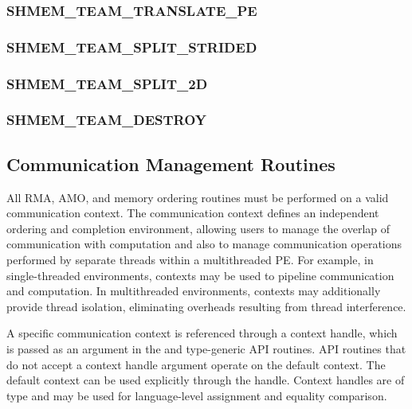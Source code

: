 \documentclass[10pt]{book}
\begin{document}
\subsubsection{\textbf{SHMEM\_TEAM\_TRANSLATE\_PE}}\label{subsec:shmem_team_translate_pe}


\subsubsection{\textbf{SHMEM\_TEAM\_SPLIT\_STRIDED}}\label{subsec:shmem_team_split_strided}


\subsubsection{\textbf{SHMEM\_TEAM\_SPLIT\_2D}}\label{subsec:shmem_team_split_2d}


\subsubsection{\textbf{SHMEM\_TEAM\_DESTROY}}\label{subsec:shmem_team_destroy}

\color{Black}




\subsection{Communication Management Routines}
\label{sec:ctx}
All \openshmem \ac{RMA}, \ac{AMO}, and memory ordering routines must be
performed on a valid communication context.  The communication context defines an
independent ordering and completion environment, allowing users to manage the
overlap of communication with computation and also to manage communication
operations performed by separate threads within a multithreaded \ac{PE}.  For
example, in single-threaded environments, contexts may be used to pipeline
communication and computation.  In multithreaded environments, contexts may
additionally provide thread isolation, eliminating overheads resulting from
thread interference.

A specific communication context is referenced through a context handle, which is
passed as an argument in the \Cstd {} and type-generic \ac{API}
routines.  \ac{API} routines that do not accept a context handle argument operate on the
default context.  The default context can be used explicitly through the
 handle.
Context handles are of type  and may be used for
language-level assignment and equality comparison.
\end{document}

